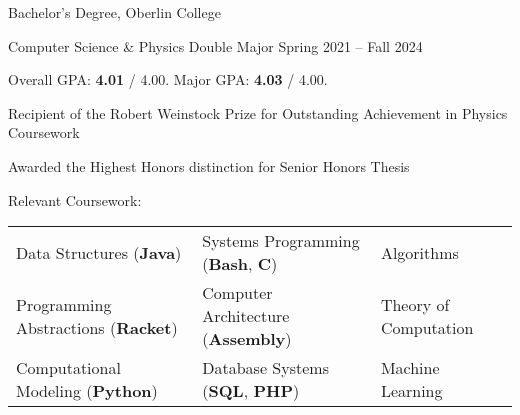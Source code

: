 \begin{entry}{Bachelor's Degree, Oberlin College}

	\entryItem
		{Computer Science \& Physics Double Major}
		{Spring 2021 -- Fall 2024}

	\begin{items}
		\item Overall GPA: \textbf{4.01} / 4.00. Major GPA: \textbf{4.03} / 4.00.
		


		\item Recipient of the Robert Weinstock Prize for Outstanding Achievement in Physics Coursework
		
		\item Awarded the Highest Honors distinction for Senior Honors Thesis
		
		\item Relevant Coursework:
		
			\hspace*{-0.25cm}
			\begin{tabular}{lll}
				Data Structures (\textbf{Java}) & Systems Programming (\textbf{Bash}, \textbf{C}) & Algorithms \\
				Programming Abstractions (\textbf{Racket}) & Computer Architecture (\textbf{Assembly}) & Theory of Computation \\
				Computational Modeling (\textbf{Python}) & Database Systems (\textbf{SQL}, \textbf{PHP}) & Machine Learning \\
			\end{tabular}
	\end{items}
		
\end{entry}
